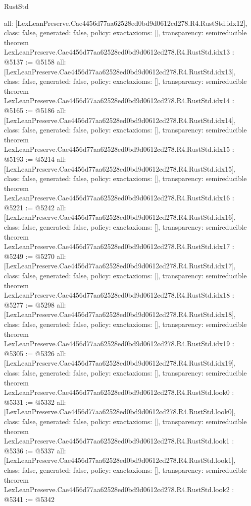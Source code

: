 \begin{lexlean}{RustStd}
\begin{coremodule}
{  all: [LexLeanPreserve.Cae4456d77aa62528ed0bd9d0612cd278.R4.RustStd.idx12],
  class: false,
  generated: false,
  policy: exact{axioms: []},
  transparency: semireducible
}
theorem LexLeanPreserve.Cae4456d77aa62528ed0bd9d0612cd278.R4.RustStd.idx13 : @5137 := @5158 {
  all: [LexLeanPreserve.Cae4456d77aa62528ed0bd9d0612cd278.R4.RustStd.idx13],
  class: false,
  generated: false,
  policy: exact{axioms: []},
  transparency: semireducible
}
theorem LexLeanPreserve.Cae4456d77aa62528ed0bd9d0612cd278.R4.RustStd.idx14 : @5165 := @5186 {
  all: [LexLeanPreserve.Cae4456d77aa62528ed0bd9d0612cd278.R4.RustStd.idx14],
  class: false,
  generated: false,
  policy: exact{axioms: []},
  transparency: semireducible
}
theorem LexLeanPreserve.Cae4456d77aa62528ed0bd9d0612cd278.R4.RustStd.idx15 : @5193 := @5214 {
  all: [LexLeanPreserve.Cae4456d77aa62528ed0bd9d0612cd278.R4.RustStd.idx15],
  class: false,
  generated: false,
  policy: exact{axioms: []},
  transparency: semireducible
}
theorem LexLeanPreserve.Cae4456d77aa62528ed0bd9d0612cd278.R4.RustStd.idx16 : @5221 := @5242 {
  all: [LexLeanPreserve.Cae4456d77aa62528ed0bd9d0612cd278.R4.RustStd.idx16],
  class: false,
  generated: false,
  policy: exact{axioms: []},
  transparency: semireducible
}
theorem LexLeanPreserve.Cae4456d77aa62528ed0bd9d0612cd278.R4.RustStd.idx17 : @5249 := @5270 {
  all: [LexLeanPreserve.Cae4456d77aa62528ed0bd9d0612cd278.R4.RustStd.idx17],
  class: false,
  generated: false,
  policy: exact{axioms: []},
  transparency: semireducible
}
theorem LexLeanPreserve.Cae4456d77aa62528ed0bd9d0612cd278.R4.RustStd.idx18 : @5277 := @5298 {
  all: [LexLeanPreserve.Cae4456d77aa62528ed0bd9d0612cd278.R4.RustStd.idx18],
  class: false,
  generated: false,
  policy: exact{axioms: []},
  transparency: semireducible
}
theorem LexLeanPreserve.Cae4456d77aa62528ed0bd9d0612cd278.R4.RustStd.idx19 : @5305 := @5326 {
  all: [LexLeanPreserve.Cae4456d77aa62528ed0bd9d0612cd278.R4.RustStd.idx19],
  class: false,
  generated: false,
  policy: exact{axioms: []},
  transparency: semireducible
}
theorem LexLeanPreserve.Cae4456d77aa62528ed0bd9d0612cd278.R4.RustStd.look0 : @5331 := @5332 {
  all: [LexLeanPreserve.Cae4456d77aa62528ed0bd9d0612cd278.R4.RustStd.look0],
  class: false,
  generated: false,
  policy: exact{axioms: []},
  transparency: semireducible
}
theorem LexLeanPreserve.Cae4456d77aa62528ed0bd9d0612cd278.R4.RustStd.look1 : @5336 := @5337 {
  all: [LexLeanPreserve.Cae4456d77aa62528ed0bd9d0612cd278.R4.RustStd.look1],
  class: false,
  generated: false,
  policy: exact{axioms: []},
  transparency: semireducible
}
theorem LexLeanPreserve.Cae4456d77aa62528ed0bd9d0612cd278.R4.RustStd.look2 : @5341 := @5342 {
}
\end{coremodule}
\end{lexlean}
